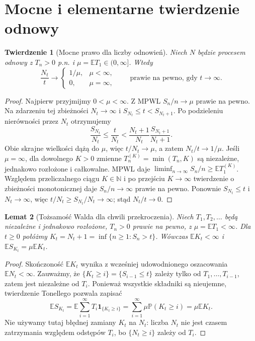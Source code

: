\documentclass[11pt,a4paper,oneside]{report}
\numberwithin{equation}{chapter}
\theoremstyle{plain}
\newtheorem{twierdzenie}{Twierdzenie}[chapter]
\newtheorem{lemat}[twierdzenie]{Lemat}
\theoremstyle{definition}
\theoremstyle{remark}
\newcommand{\N}{\mathbb{N}}
\newcommand{\Prob}{\mathbb{P}}
\newcommand{\E}{\mathbb{E}}
\newcommand{\ind}[1]{\mathbf{1}_{#1}}
\begin{document}
\section{Mocne i elementarne twierdzenie odnowy}
\begin{twierdzenie}[Mocne prawo dla liczby odnowień]
Niech $N$ będzie procesem odnowy z $T_n>0$ p.n.
i $\mu=\E T_1\in(0,\infty]$.
Wtedy
\[
\frac{N_t}{t}\longrightarrow
\begin{cases}1/\mu,&\mu<\infty,\\0,&\mu=\infty,\end{cases}
\qquad\text{prawie na pewno, gdy }t\to\infty.
\]
\end{twierdzenie}
\begin{proof}
Najpierw przyjmijmy $0<\mu<\infty$.
Z MPWL $S_n/n\to\mu$ prawie na pewno.
Na zdarzeniu tej zbieżności $N_t\to\infty$ i
$S_{N_t}\le t<S_{N_t+1}$. Po podzieleniu nierówności
przez $N_t$ otrzymujemy
\[
\frac{S_{N_t}}{N_t}\le \frac{t}{N_t}
<\frac{N_t+1}{N_t}\frac{S_{N_t+1}}{N_t+1}.
\]
Obie skrajne wielkości dążą do $\mu$, więc
$t/N_t\to\mu$, a zatem $N_t/t\to1/\mu$.
Jeśli $\mu=\infty$, dla dowolnego $K>0$ zmienne
$T_n^{(K)}=\min(T_n,K)$ są niezależne, jednakowo rozłożone
i całkowalne. MPWL daje
$\liminf_{n\to\infty}S_n/n\ge\E T_1^{(K)}$.
Względem przeliczalnego ciągu $K\in\N$ i po przejściu
$K\to\infty$ twierdzenie o zbieżności monotonicznej
daje $S_n/n\to\infty$ prawie na pewno.
Ponownie $S_{N_t}\le t$ i $N_t\to\infty$, więc
$t/N_t\ge S_{N_t}/N_t\to\infty$; stąd $N_t/t\to0$.
\end{proof}

\begin{lemat}[Tożsamość Walda dla chwili przekroczenia]
Niech $T_1,T_2,\ldots$ będą niezależne i jednakowo rozłożone,
$T_n>0$ prawie na pewno, z $\mu=\E T_1<\infty$.
Dla $t\ge0$ połóżmy $K_t=N_t+1=\inf\{n\ge1:S_n>t\}$.
Wówczas $\E K_t<\infty$ i
$\E S_{K_t}=\mu\E K_t$.
\end{lemat}
\begin{proof}
Skończoność $\E K_t$ wynika z wcześniej udowodnionego
oszacowania $\E N_t<\infty$. Zauważmy, że
$\{K_t\ge i\}=\{S_{i-1}\le t\}$ zależy tylko od
$T_1,\ldots,T_{i-1}$, zatem jest niezależne od $T_i$.
Ponieważ wszystkie składniki są nieujemne, twierdzenie Tonellego
pozwala zapisać
\[
\E S_{K_t}=\E\sum_{i=1}^\infty T_i\ind{\{K_t\ge i\}}
=\sum_{i=1}^\infty\mu\Prob(K_t\ge i)
=\mu\E K_t.
\]
Nie używamy tutaj błędnej zamiany $K_t$ na $N_t$:
liczba $N_t$ nie jest czasem zatrzymania względem
odstępów $T_i$, bo $\{N_t\ge i\}$ zależy od $T_i$.
\end{proof}
\end{document}
